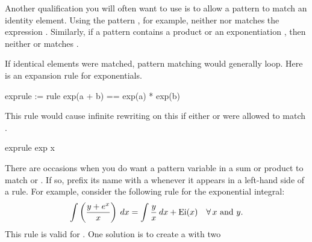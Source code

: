 {Another qualification you will often want to use is to allow a pattern to
match an identity element.
Using the pattern , for example, neither  nor 
matches the expression .
Similarly, if a pattern contains a product  or an exponentiation
, then neither  or  matches .
%
\begin{xtc}
\begin{xtccomment}
If identical elements were matched, pattern matching would generally loop.
Here is an expansion rule for exponentials.
\end{xtccomment}
\begin{spadsrc}
exprule := rule exp(a + b) == exp(a) * exp(b)
\end{spadsrc}
\begin{TeXOutput}
\begin{fricasmath}{15}
\SYMBOL{\ ==\ }\TIMES {}%
\end{fricasmath}
\end{TeXOutput}
\end{xtc}
\begin{xtc}
\begin{xtccomment}
This rule would cause infinite rewriting on this if either  or
 were allowed to match .
\end{xtccomment}
\begin{spadsrc}
exprule exp x 
\end{spadsrc}
\begin{TeXOutput}
\begin{fricasmath}{16}
%
\end{fricasmath}
\end{TeXOutput}
\end{xtc}
%
There are occasions when you do want a pattern variable in a sum or
product to match  or .
If so, prefix its name
with a  whenever it appears in a left-hand side of a rule.
For example, consider the following rule for the exponential integral:
\begin{displaymath}
  \int \left(\frac{y+e^x}{x}\right)\: dx = \int \frac{y}{x}\: dx + \hbox{\rm Ei}(x)
  \quad\forall \, x \hbox{\ and\ } y.
\end{displaymath}
This rule is valid for .
One solution is to create a  with two
}
